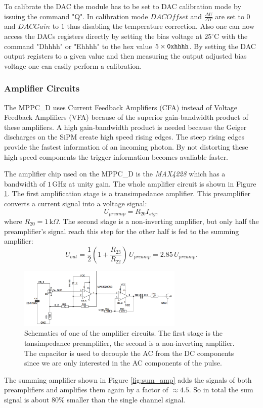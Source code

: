 To calibrate the DAC the module has to be set to DAC calibration mode by issuing the command "Q". In calibration mode $DACOffset$ and $\frac{\Delta U}{\Delta T}$ 
are set to $0$ and $DACGain$ to $1$ thus disabling the temperature correction. Also one can now access the DACs registers directly by setting the bias voltage 
at $25^{\circ} \text{C}$ with the command "Dhhhh" or "Ehhhh" to the hex value $5\times\verb|0xhhhh|$. By setting the DAC output registers to a given value and then measuring the 
output adjusted bias voltage one can easily perform a calibration.

\subsubsection{Amplifier Circuits}

The MPPC\_D uses Current Feedback Amplifiers (CFA) instead of Voltage Feedback Amplifiers (VFA) because of the superior gain-bandwidth product of these amplifiers. A high 
gain-bandwidth product is needed because the Geiger discharges on the SiPM create high speed rising edges. The steep rising edges provide the fastest information of an incoming photon. 
By not distorting these high speed components the trigger information becomes avaliable faster.

The amplifier chip used on the MPPC\_D is the \emph{MAX4228} which has a bandwidth of $1\,\text{GHz}$ at unity gain. The whole amplifier circuit is shown in Figure \ref{fig:amp_cir}. 
The first amplification stage is a transimpedance amplifier. This preamplifier converts a current signal into a voltage signal:
\begin{equation}
	U_{preamp} = R_{20} I_{sig},
\end{equation}
where $R_{20} = 1\,\text{k}\Omega$. The second stage is a non-inverting amplifier, but only half the preamplifier's signal reach this step for the other half is fed to the summing amplifier:
\begin{equation}
	U_{out} = \frac{1}{2} (1 + \frac{R_{23}}{R_{22}}) \, U_{preamp} = 2.85 \, U_{preamp}.
\end{equation}

	\begin{figure}[t]
		\centering
			\includegraphics[width=0.7\textwidth]{Figures/weinstock/amplifier_circuit.png}
		\caption{Schematics of one of the amplifier circuits. The first stage is the tansimpedance preamplifier, the second is a non-inverting amplifier. The capacitor is used to decouple the AC from the DC components since we are only interested in the AC components of the pulse.}
		\label{fig:amp_cir}
	\end{figure}	
The summing amplifier shown in Figure \ref{fig:sum_amp} adds the signals of both preamplifiers and amplifies them again by a factor of $\approx4.5$. So in total the sum signal is about $80\%$ smaller than the single channel signal.

